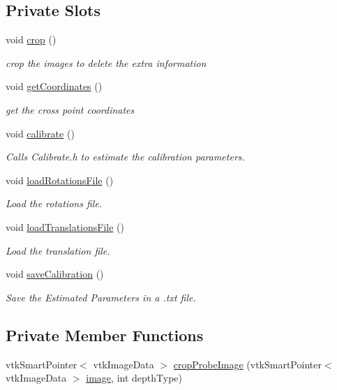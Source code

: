 \subsection*{Private Slots}
\begin{DoxyCompactItemize}
\item 
void \hyperlink{class_probe_calibration_widget_aee10394430b33e5c67faffc0711aa72c}{crop} ()
\begin{DoxyCompactList}\small\item\em crop the images to delete the extra information \end{DoxyCompactList}\item 
void \hyperlink{class_probe_calibration_widget_acd3137343b02733ba647c207874f1553}{get\-Coordinates} ()
\begin{DoxyCompactList}\small\item\em get the cross point coordinates \end{DoxyCompactList}\item 
void \hyperlink{class_probe_calibration_widget_a2c7d23d2c8b75bc8bae31c3593f7ce68}{calibrate} ()
\begin{DoxyCompactList}\small\item\em Calls Calibrate.\-h to estimate the calibration parameters. \end{DoxyCompactList}\item 
void \hyperlink{class_probe_calibration_widget_a272a7b3f75c96bafb868419ace5e0988}{load\-Rotations\-File} ()
\begin{DoxyCompactList}\small\item\em Load the rotations file. \end{DoxyCompactList}\item 
void \hyperlink{class_probe_calibration_widget_a33f06682399f16721d717c97ca0654be}{load\-Translations\-File} ()
\begin{DoxyCompactList}\small\item\em Load the translation file. \end{DoxyCompactList}\item 
void \hyperlink{class_probe_calibration_widget_a441905e2966c3bc87884d96c31073cd5}{save\-Calibration} ()
\begin{DoxyCompactList}\small\item\em Save the Estimated Parameters in a .txt file. \end{DoxyCompactList}\end{DoxyCompactItemize}
\subsection*{Private Member Functions}
\begin{DoxyCompactItemize}
\item 
vtk\-Smart\-Pointer$<$ vtk\-Image\-Data $>$ \hyperlink{class_probe_calibration_widget_a87d9b425235afcabde1a9de067ba8d2d}{crop\-Probe\-Image} (vtk\-Smart\-Pointer$<$ vtk\-Image\-Data $>$ \hyperlink{class_probe_calibration_widget_a5f639b7a6f3c520427f245e44c51c962}{image}, int depth\-Type)
\end{DoxyCompactItemize}
